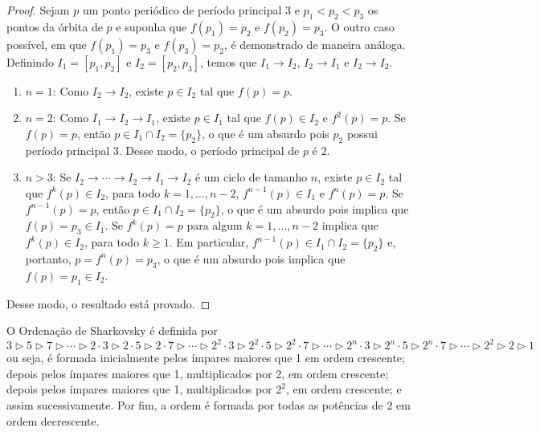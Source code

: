\begin{proof}
Sejam $p$ um ponto periódico de período principal $3$ e $p_1 < p_2 < p_3$ os pontos da órbita de $p$ e suponha que $f(p_1) = p_2$ e $f(p_2) = p _3$. O outro caso possível, em que $f(p_1) = p_3$ e $f(p_3) = p_2$, é demonstrado de maneira análoga. Definindo $I_1 = [p_1, p_2]$ e $I_2 = [p_2, p_3]$, temos que $I_1 \longrightarrow I_2$, $I_2 \longrightarrow I_1$ e $I_2 \longrightarrow I_2$.
\begin{enumerate}[label=(\alph*)]
\item $n = 1$: Como $I_2 \longrightarrow I_2$, existe $p \in I_2$ tal que $f(p) = p$.
\item $n = 2$: Como $I_1 \longrightarrow I_2 \longrightarrow I_1$, existe $p \in I_1$ tal que $f(p) \in I_2$ e $f^2(p) = p$. Se $f(p) = p$, então $p \in I_1 \cap I_2 = \{p_2\}$, o que é um absurdo pois $p_2$ possui período principal 3. Desse modo, o período principal de $p$ é $2$.
\item $n > 3$: Se $I_2 \longrightarrow \cdots \longrightarrow I_2 \longrightarrow I_1 \longrightarrow I_2$ é um ciclo de tamanho $n$, existe $p \in I_2$ tal que $f^k(p) \in I_2$, para todo $k = 1, \dots, n-2$, $f^{n-1}(p) \in I_1$ e $f^n(p) = p$. Se $f^{n-1}(p) = p$, então $p \in I_1 \cap I_2 = \{p_2\}$, o que é um absurdo pois implica que $f(p) = p_3 \in I_1$. Se $f^k(p) = p$ para algum $k = 1, \dots, n-2$ implica que $f^k(p) \in I_2$, para todo $k \geq 1$. Em particular, $f^{n-1}(p) \in I_1 \cap I_2 = \{p_2\}$ e, portanto, $p = f^n(p) = p_3$, o que é um absurdo pois implica que $f(p) = p_1 \in I_2$. 
\end{enumerate}
Desse modo, o resultado está provado.
\end{proof}

\begin{definition}
O Ordenação de Sharkovsky é definida por
$$3 \triangleright 5 \triangleright 7 \triangleright \cdots
\triangleright 2 \cdot 3 \triangleright 2 \cdot 5 \triangleright 2 \cdot 7 \triangleright \cdots
\triangleright 2^2 \cdot 3 \triangleright 2^2 \cdot 5 \triangleright 2^2 \cdot 7 \triangleright \cdots
\triangleright 2^n \cdot 3 \triangleright 2^n \cdot 5 \triangleright 2^n \cdot 7 \triangleright \cdots
\triangleright 2^2 \triangleright 2 \triangleright 1$$
ou seja, é formada inicialmente pelos ímpares maiores que 1 em ordem crescente; depois pelos ímpares maiores que 1, multiplicados por 2, em ordem crescente; depois pelos ímpares maiores que 1, multiplicados por $2^2$, em ordem crescente; e assim sucessivamente. Por fim, a ordem é formada por todas as potências de 2 em ordem decrescente.
\end{definition}

